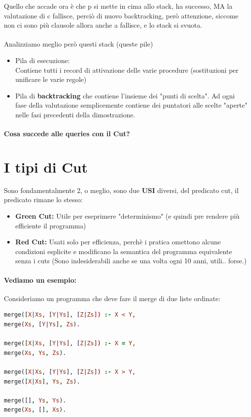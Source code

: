 \documentclass[12pt, a4paper, openany, oneside]{book}
\begin{document}
Quello che accade ora è che p si mette in cima allo stack, ha successo, MA
la valutazione di c fallisce, perciò di nuovo backtracking, però attenzione,
siccome non ci sono più clausole allora anche a fallisce, e lo stack si svuota.
\\ \\
Analizziamo meglio però questi stack (queste pile)
\begin{itemize}
	\item Pila di esecuzione: \\
	Contiene tutti i record di attivazione delle varie procedure (sostituzioni
	per unificare le varie regole)
	\item Pila di \color{red}\textbf{backtracking} \color{black} che contiene 
	l'insieme dei "punti di scelta". Ad ogni fase della valutazione semplicemente
	contiene dei puntatori alle scelte "aperte" nelle fasi precedenti della
	dimostrazione.
\end{itemize}
\paragraph{Cosa succede alle queries con il Cut?}
\section{I tipi di Cut}
Sono fondamentalmente 2, o meglio, sono due \textbf{USI} diversi, del predicato
cut, il predicato rimane lo stesso:
\begin{itemize}
	\item \color{green}\textbf{Green Cut: }\color{black} Utile per eseprimere 
	"determinismo" (e quindi pre rendere più efficiente il programma)
	\item \color{red}\textbf{Red Cut: }\color{black} Usati solo per efficienza,
	perchè i pratica omettono alcune condizioni esplicite e modificano la 
	semantica del programma equivalente senza i cuts (Sono indesiderabili anche
	se una volta ogni 10 anni, utili.. forse.)
\end{itemize}
\paragraph{Vediamo un esempio: }Consideriamo un programma che deve fare il merge
di due liste ordinate: 
\begin{lstlisting}[language=Prolog] 
merge([X|Xs, [Y|Ys], [Z|Zs]) :- X < Y,
merge(Xs, [Y|Ys], Zs).

merge([X|Xs, [Y|Ys], [Z|Zs]) :- X = Y,
merge(Xs, Ys, Zs).

merge([X|Xs, [Y|Ys], [Z|Zs]) :- X > Y,
merge([X|Xs], Ys, Zs).

merge([], Ys, Ys).
merge(Xs, [], Xs).
\end{lstlisting} 
\end{document}
